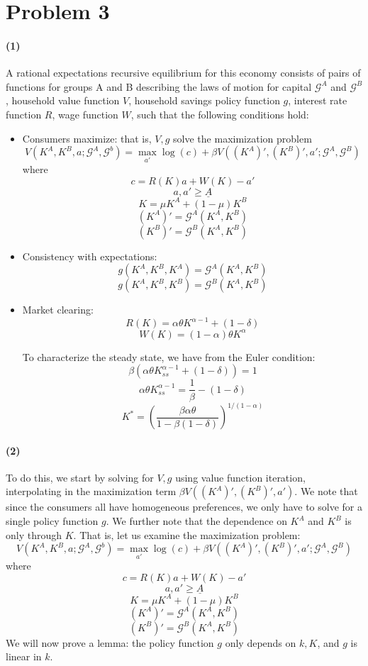 \documentclass[10pt,letter]{article}
\newcommand{\problem}[1]{\section*{Problem #1}}
\newcommand{\problempart}[1]{\paragraph{#1}}
\begin{document}
\pagebreak
\problem{3}
\problempart{(1)}
A rational expectations recursive equilibrium for this economy consists of pairs of functions for groups A and B describing the laws of motion for capital $\mathcal{G}^A$ and $\mathcal{G}^B$, household value function $V$, household savings policy function $g$, interest rate function $R$, wage function $W$, such that the following conditions hold:
\begin{itemize}
\item Consumers maximize: that is, $V, g$ solve the maximization problem
\[ V(K^A, K^B, a; \mathcal{G}^A, \mathcal{G}^b) = \max_{a'} \log(c) + \beta V((K^A)', (K^B)', a'; \mathcal{G}^A, \mathcal{G}^B) \]
where
\[ c = R(K)a + W(K) - a' \]
\[ a, a' \ge \underline{A} \]
\[ K = \mu K^A + (1-\mu) K^B \]
\[ (K^A)' = \mathcal{G}^A(K^A, K^B) \]
\[ (K^B)' = \mathcal{G}^B(K^A, K^B) \]
\item Consistency with expectations:
\[ g(K^A, K^B, K^A) = \mathcal{G}^A(K^A, K^B) \]
\[ g(K^A, K^B, K^B) = \mathcal{G}^B(K^A, K^B) \]
\item Market clearing:
\[ R(K) = \alpha \theta K^{\alpha - 1} + (1-\delta)\]
\[ W(K) = (1-\alpha)\theta K^{\alpha} \]

To characterize the steady state, we have from the Euler condition:
\[ \beta (\alpha \theta K_{ss}^{\alpha - 1} + (1-\delta)) = 1 \]
\[ \alpha \theta K_{ss}^{\alpha - 1} = \frac{1}{\beta} - (1-\delta) \]
\[ K^* = \left(\frac{\beta \alpha \theta}{1 - \beta(1 - \delta)} \right)^{1/(1-\alpha)}\]
\end{itemize}
\problempart{(2)}
To do this, we start by solving for $V, g$ using value function iteration, interpolating in the maximization term $\beta V((K^A)', (K^B)', a')$. We note that since the consumers all have homogeneous preferences, we only have to solve for a single policy function $g$. We further note that the dependence on $K^A$ and $K^B$ is only through $K$. That is, let us examine the maximization problem:
\[ V(K^A, K^B, a; \mathcal{G}^A, \mathcal{G}^b) = \max_{a'} \log(c) + \beta V((K^A)', (K^B)', a'; \mathcal{G}^A, \mathcal{G}^B) \]
where
\[ c = R(K)a + W(K) - a' \]
\[ a, a' \ge \underline{A} \]
\[ K = \mu K^A + (1-\mu) K^B \]
\[ (K^A)' = \mathcal{G}^A(K^A, K^B) \]
\[ (K^B)' = \mathcal{G}^B(K^A, K^B) \]
We will now prove a lemma: the policy function $g$ only depends on $k, K$, and $g$ is linear in $k$.
\end{document}
